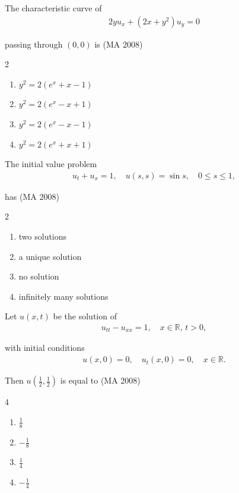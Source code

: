 \item
The characteristic curve of
\begin{align}
    2 y u_x + (2x + y^2) u_y = 0
\end{align}

passing through $(0,0)$ is
\hfill (MA 2008)
\begin{multicols}{2}
\begin{enumerate}
    \item $y^2 = 2(e^x + x - 1)$
    \item $y^2 = 2(e^x - x + 1)$
    \item $y^2 = 2(e^x - x - 1)$
    \item $y^2 = 2(e^x + x + 1)$
\end{enumerate}
\end{multicols}

\item
The initial value problem
\begin{align}
    u_t + u_x = 1, \quad u(s,s) = \sin s, \quad 0 \leq s \leq 1,
\end{align}

has
\hfill (MA 2008)
\begin{multicols}{2}
\begin{enumerate}
    \item two solutions
    \item a unique solution
    \item no solution
    \item infinitely many solutions
\end{enumerate}
\end{multicols}

\item
Let $u(x,t)$ be the solution of 
\begin{align}
    u_{tt} - u_{xx} = 1, \quad x \in \mathbb{R}, \, t > 0,
\end{align}

with initial conditions
\begin{align}
    u(x,0) = 0, \quad u_t(x,0) = 0, \quad x \in \mathbb{R}.
\end{align}

Then $u\left(\frac{1}{2}, \frac{1}{2}\right)$ is equal to
\hfill (MA 2008)
\begin{multicols}{4}
\begin{enumerate}
    \item $\frac{1}{8}$
    \item $-\frac{1}{8}$
    \item $\frac{1}{4}$
    \item $-\frac{1}{4}$
\end{enumerate}
\end{multicols}

